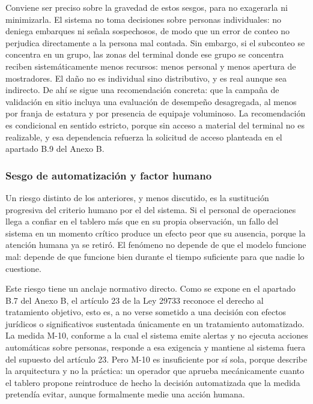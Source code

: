 Conviene ser preciso sobre la gravedad de estos sesgos, para no
exagerarla ni minimizarla. El sistema no toma decisiones sobre personas
individuales: no deniega embarques ni señala sospechosos, de modo que un
error de conteo no perjudica directamente a la persona mal contada. Sin
embargo, si el subconteo se concentra en un grupo, las zonas del
terminal donde ese grupo se concentra reciben sistemáticamente menos
recursos: menos personal y menos apertura de mostradores. El daño no es
individual sino distributivo, y es real aunque sea indirecto. De ahí se
sigue una recomendación concreta: que la campaña de validación en sitio
incluya una evaluación de desempeño desagregada, al menos por franja de
estatura y por presencia de equipaje voluminoso. La recomendación es
condicional en sentido estricto, porque sin acceso a material del
terminal no es realizable, y esa dependencia refuerza la solicitud de
acceso planteada en el apartado B.9 del Anexo B.

\subsubsection{Sesgo de automatización y factor humano}

Un riesgo distinto de los anteriores, y menos discutido, es la
sustitución progresiva del criterio humano por el del sistema. Si el
personal de operaciones llega a confiar en el tablero más que en su
propia observación, un fallo del sistema en un momento crítico produce
un efecto peor que su ausencia, porque la atención humana ya se retiró.
El fenómeno no depende de que el modelo funcione mal: depende de que
funcione bien durante el tiempo suficiente para que nadie lo cuestione.

Este riesgo tiene un anclaje normativo directo. Como se expone en el
apartado B.7 del Anexo B, el artículo 23 de la Ley 29733 reconoce el
derecho al tratamiento objetivo, esto es, a no verse sometido a una
decisión con efectos jurídicos o significativos sustentada únicamente en
un tratamiento automatizado. La medida M-10, conforme a la cual el
sistema emite alertas y no ejecuta acciones automáticas sobre personas,
responde a esa exigencia y mantiene al sistema fuera del supuesto del
artículo 23. Pero M-10 es insuficiente por sí sola, porque describe la
arquitectura y no la práctica: un operador que aprueba mecánicamente
cuanto el tablero propone reintroduce de hecho la decisión automatizada
que la medida pretendía evitar, aunque formalmente medie una acción
humana.

